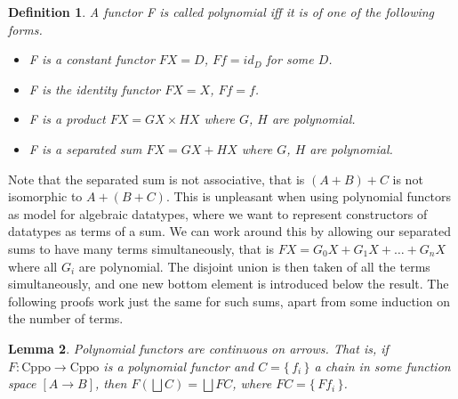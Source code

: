 \documentclass[a4paper]{article}
\newcommand{\arr}{\rightarrow}
\newcommand{\lub}{\bigsqcup}
\newcommand{\set}[1]{\{\,#1\,\}}
\newcommand{\Cppo}{\text{Cppo}}
\newcommand{\product}{\!\times\!}
\newtheorem{definition}{Definition}[section]
\newtheorem{lemma}[definition]{Lemma}
\begin{document}
\begin{definition}
A functor F is called \emph{polynomial} iff it is of one of the following forms.
\begin{itemize}[noitemsep]
\item F is a constant functor $FX = D$, $Ff = id_D$ for some $D$.
\item F is the identity functor $FX = X$, $Ff = f$.
\item F is a product $FX = GX \product HX$ where $G$, $H$ are polynomial.
\item F is a separated sum $FX = GX + HX$ where $G$, $H$ are polynomial.
\end{itemize}
\end{definition}

Note that the separated sum is not associative, that is $(A + B) + C$ is not
isomorphic to $A + (B + C)$. This is unpleasant when using polynomial functors
as model for algebraic datatypes, where we want to represent constructors of
datatypes as terms of a sum. We can work around this by allowing our separated
sums to have many terms simultaneously, that is $FX = G_0X + G_1X + \ldots +
G_nX$ where all $G_i$ are polynomial. The disjoint union is then taken of all
the terms simultaneously, and one new bottom element is introduced below the
result. The following proofs work just the same for such sums, apart from some
induction on the number of terms.

\begin{lemma} \label{lemPolynomialFunctorsContinuous}
Polynomial functors are continuous on arrows. That is, if $F : \Cppo \arr \Cppo$
is a polynomial functor and $C = \set{f_i}$ a chain in some function space $[A
\arr B]$, then $F(\lub C) = \lub FC$, where $FC = \set{Ff_i}$.
\end{lemma}
\end{document}

